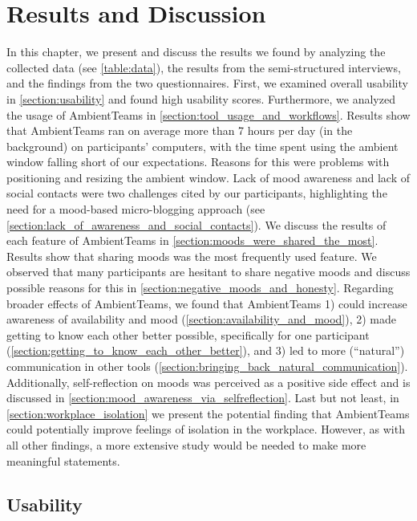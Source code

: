 \chapter{Results and Discussion}
\label{chapter:results_and_discussion}

In this chapter, we present and discuss the results we found by analyzing the collected data (see \autoref{table:data}), the results from the semi-structured interviews, and the findings from the two questionnaires. First, we examined overall usability in \autoref{section:usability} and found high usability scores. Furthermore, we analyzed the usage of AmbientTeams in \autoref{section:tool_usage_and_workflows}. Results show that AmbientTeams ran on average more than 7 hours per day (in the background) on participants' computers, with the time spent using the ambient window falling short of our expectations. Reasons for this were problems with positioning and resizing the ambient window. Lack of mood awareness and lack of social contacts were two challenges cited by our participants, highlighting the need for a mood-based micro-blogging approach (see \autoref{section:lack_of_awareness_and_social_contacts}). We discuss the results of each feature of AmbientTeams in \autoref{section:moods_were_shared_the_most}. Results show that sharing moods was the most frequently used feature. We observed that many participants are hesitant to share negative moods and discuss possible reasons for this in \autoref{section:negative_moods_and_honesty}. Regarding broader effects of AmbientTeams, we found that AmbientTeams 1) could increase awareness of availability and mood (\autoref{section:availability_and_mood}), 2) made getting to know each other better possible, specifically for one participant (\autoref{section:getting_to_know_each_other_better}), and 3) led to more (\enquote{natural}) communication in other tools (\autoref{section:bringing_back_natural_communication}). Additionally, self-reflection on moods was perceived as a positive side effect and is discussed in \autoref{section:mood_awareness_via_selfreflection}. Last but not least, in \autoref{section:workplace_isolation} we present the potential finding that AmbientTeams could potentially improve feelings of isolation in the workplace. However, as with all other findings, a more extensive study would be needed to make more meaningful statements.

\section{Usability}
\label{section:usability}

